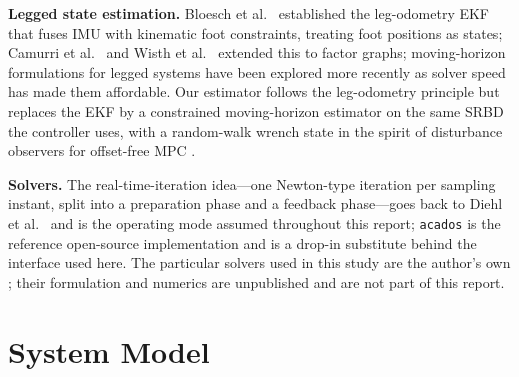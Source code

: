 \documentclass[11pt]{article}
\begin{document}
\textbf{Legged state estimation.} Bloesch et al.\ \cite{bloesch2013} established the leg-odometry EKF that fuses IMU with kinematic foot constraints, treating foot positions as states; Camurri et al.\ \cite{camurri2020} and Wisth et al.\ \cite{wisth2019} extended this to factor graphs; moving-horizon formulations for legged systems have been explored more recently as solver speed has made them affordable. Our estimator follows the leg-odometry principle but replaces the EKF by a constrained moving-horizon estimator on the same SRBD the controller uses, with a random-walk wrench state in the spirit of disturbance observers for offset-free MPC \cite{pannocchia2003}.

\textbf{Solvers.} The real-time-iteration idea---one Newton-type iteration per sampling instant, split into a preparation phase and a feedback phase---goes back to Diehl et al.\ \cite{diehl2005} and is the operating mode assumed throughout this report; \texttt{acados} \cite{acados} is the reference open-source implementation and is a drop-in substitute behind the interface used here. The particular solvers used in this study are the author's own \cite{solvers,thesis}; their formulation and numerics are unpublished and are not part of this report.

\section{System Model}
\end{document}

